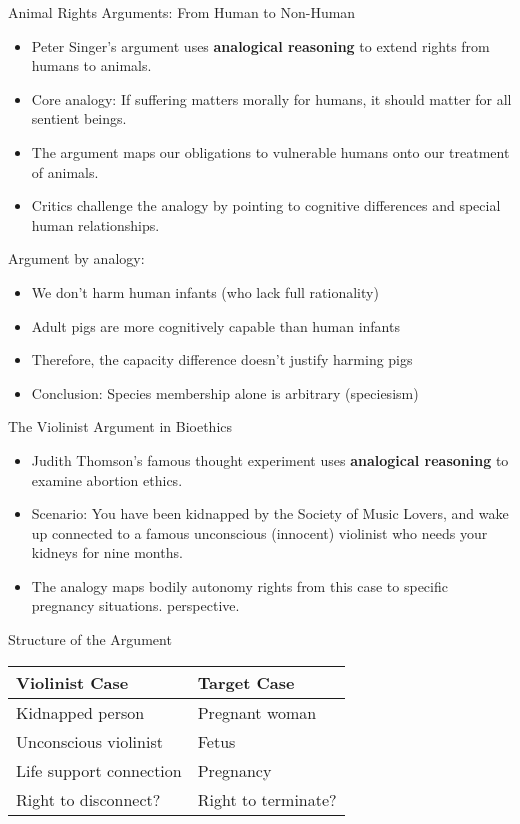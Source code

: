 \documentclass{beamer}
\begin{document}
	\begin{frame}{Animal Rights Arguments: From Human to Non-Human}
		\begin{itemize}
			\item Peter Singer's argument uses \textbf{analogical reasoning} to extend rights from humans to animals.
			\item Core analogy: If suffering matters morally for humans, it should matter for all sentient beings.
			\item The argument maps our obligations to vulnerable humans onto our treatment of animals.
			\item Critics challenge the analogy by pointing to cognitive differences and special human relationships.
		\end{itemize}
		
		\begin{example}
			Argument by analogy:
			\begin{itemize}
				\item We don't harm human infants (who lack full rationality)
				\item Adult pigs are more cognitively capable than human infants
				\item Therefore, the capacity difference doesn't justify harming pigs
				\item Conclusion: Species membership alone is arbitrary (speciesism)
			\end{itemize}
		\end{example}
	\end{frame}
	
	\begin{frame}{The Violinist Argument in Bioethics}
		\begin{itemize}
			\item Judith Thomson's famous thought experiment uses \textbf{analogical reasoning} to examine abortion ethics.
			\item Scenario: You have been kidnapped by the Society of Music Lovers, and wake up connected to a famous unconscious (innocent) violinist who needs your kidneys for nine months.
			\item The analogy maps bodily autonomy rights from this case to specific pregnancy situations. perspective.
		\end{itemize}
		
		\begin{block}{Structure of the Argument}
			\begin{tabular}{l|l}
				\textbf{Violinist Case} & \textbf{Target Case} \\
				\hline
				Kidnapped person & Pregnant woman \\
				Unconscious violinist & Fetus \\
				Life support connection & Pregnancy \\
				Right to disconnect? & Right to terminate?
			\end{tabular}
		\end{block}
	\end{frame}
	
\end{document}
